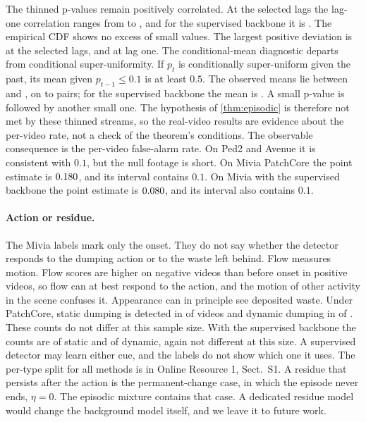 The thinned p-values remain positively correlated. At the selected lags the
lag-one correlation ranges from \RThreeDepCorrMin{} to \RThreeDepCorrMax{}, and for the
supervised backbone it is \RThreeMiviaSupDepCorr{}. The empirical CDF shows no excess
of small values. The largest positive deviation is \RThreeDepSupMax{} at the selected
lags, and \RThreeDepSupOneMax{} at lag one.
The conditional-mean diagnostic departs from conditional super-uniformity. If $p_t$
is conditionally super-uniform given the past, its mean given $p_{t-1}\le0.1$ is at
least $0.5$. The observed means lie between \RThreeDepCondMin{} and
\RThreeDepCondMax{}, on \RThreeDepCountMin{} to \RThreeDepCountMax{} pairs; for the
supervised backbone the mean is \RThreeMiviaSupDepCond{}. A small
p-value is followed by another small one. The hypothesis of \cref{thm:episodic} is
therefore not met by these thinned streams, so the real-video results are evidence
about the per-video rate, not a check of the theorem's conditions. The observable
consequence is the per-video false-alarm rate. On Ped2 and Avenue it is consistent
with $0.1$, but the null footage is short. On Mivia PatchCore the point estimate is
$0.180{}$, and its interval contains $0.1$. On Mivia with the supervised
backbone the point estimate is $0.080{}$, and its interval also contains $0.1$.


\paragraph{Action or residue.} The Mivia labels mark only the onset. They do
not say whether the detector responds to the dumping action or to the waste
left behind. Flow measures motion. Flow scores are higher on negative videos
than before onset in positive videos, so flow can at best respond to the
action, and the motion of other activity in the scene confuses it. Appearance
can in principle see deposited waste. Under PatchCore, static dumping is
detected in \RThreeMiviaPCStaticDetk{} of \RThreeMiviaPCStaticDetn{} videos and
dynamic dumping in \RThreeMiviaPCDynDetk{} of \RThreeMiviaPCDynDetn{}. These
counts do not differ at this sample size. With the supervised backbone the counts are
\RThreeMiviaSupStaticDetk{} of \RThreeMiviaSupStaticDetn{} static and
\RThreeMiviaSupDynDetk{} of \RThreeMiviaSupDynDetn{} dynamic, again not different at this
size. A supervised detector may learn either cue, and the labels do not show which
one it uses. The per-type split for all methods is in Online Resource 1, Sect.~S1. A
residue that persists after the action is the permanent-change case, in which the
episode never ends, $\eta=0$. The episodic mixture contains that case. A dedicated
residue model would change the background model itself, and we leave it to future
work.

